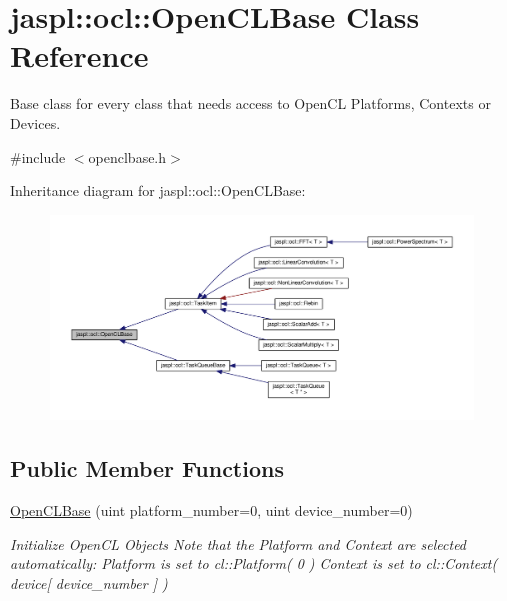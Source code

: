 \hypertarget{classjaspl_1_1ocl_1_1_open_c_l_base}{}\section{jaspl\+:\+:ocl\+:\+:Open\+C\+L\+Base Class Reference}
\label{classjaspl_1_1ocl_1_1_open_c_l_base}


Base class for every class that needs access to Open\+CL Platforms, Contexts or Devices.  




{\ttfamily \#include $<$openclbase.\+h$>$}



Inheritance diagram for jaspl\+:\+:ocl\+:\+:Open\+C\+L\+Base\+:\nopagebreak
\begin{figure}[H]
\begin{center}
\leavevmode
\includegraphics[width=350pt]{classjaspl_1_1ocl_1_1_open_c_l_base__inherit__graph}
\end{center}
\end{figure}
\subsection*{Public Member Functions}
\begin{DoxyCompactItemize}
\item 
\hyperlink{classjaspl_1_1ocl_1_1_open_c_l_base_a60c09a482b92e3e5fcaa488fcd391dcb}{Open\+C\+L\+Base} (uint platform\+\_\+number=0, uint device\+\_\+number=0)
\begin{DoxyCompactList}\small\item\em Initialize Open\+CL Objects Note that the Platform and Context are selected automatically\+: Platform is set to cl\+::\+Platform( 0 ) Context is set to cl\+::\+Context( device\mbox{[} device\+\_\+number \mbox{]} ) \end{DoxyCompactList}\end{DoxyCompactItemize}
